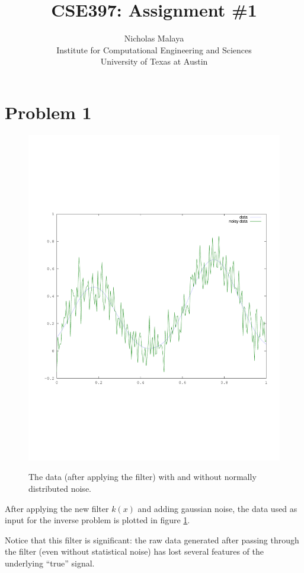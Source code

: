 \documentclass{article}
\title{\bf{CSE397: Assignment \#1}}
\author{Nicholas Malaya \\ Institute for Computational Engineering and Sciences \\ University of Texas at Austin} \date{}
\begin{document}
\maketitle

\newpage
\section{Problem 1}

\begin{figure}[p]
  \includegraphics[scale=.5]{plots/data.pdf}
  \label{fig:data}
  \caption{The data (after applying the filter) with and without
 normally distributed noise. } 
\end{figure}

After applying the new filter $k(x)$ and adding gaussian noise, the data
used as input for the inverse problem is plotted in figure
\ref{fig:data}. 

Notice that this filter is significant: the raw data generated after
passing through the filter (even without statistical noise) has lost
several features of the underlying ``true'' signal. 
\end{document}
